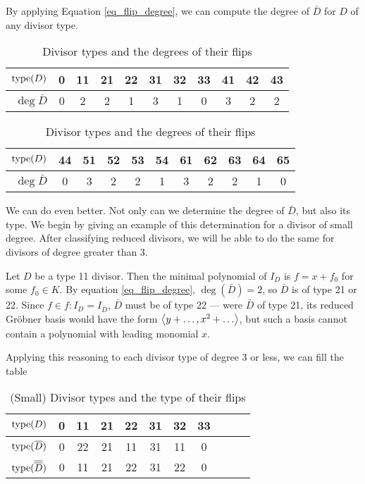 By applying Equation \ref{eq_flip_degree},
we can compute the degree of $\bar D$ for $D$ of any divisor type.
\begin{table}[hb!]
\label{tab_flip_degree}
\begin{center}
  \begin{tabular}{r|cccccccccc}
    $\operatorname{type}(D)$    & 0 & 11 & 21 & 22 & 31 & 32 & 33 & 41 & 42 & 43 \\
    \hline
    $\deg \bar D$ & 0 & 2  & 2  & 1  & 3  & 1  & 0  & 3  & 2  & 2
  \end{tabular}
    
  \begin{tabular}{r|cccccccccc}
    $\operatorname{type}(D)$    & 44 & 51 & 52 & 53 & 54 & 61 & 62 & 63 & 64 & 65 \\
    \hline 
    $\deg \bar D$ & 0  & 3  & 2  & 2  & 1  & 3  & 2  & 2  & 1  & 0
  \end{tabular}
\end{center}
\caption{Divisor types and the degrees of their flips}
\end{table}

We can do even better.
Not only can we determine the degree of $\bar D$, but also its type.
We begin by giving an example of this determination for a divisor of small degree.
After classifying reduced divisors, we will be able to do the same for divisors of degree greater than 3.

\begin{example}
  Let $D$ be a type 11 divisor.
  Then the minimal polynomial of $I_D$ is $f = x + f_0$ for some $f_0 \in K$.
  By equation \ref{eq_flip_degree}, $\deg(\bar D) = 2$, so $\bar D$ is of type 21 or 22.
  Since $f \in f : I_D = I_{\bar D}$, $\bar D$ must be of type 22 ---
  were $\bar D$ of type 21, its reduced Gr\"obner basis would have the form $\left\langle y + \ldots, x^2 + \ldots \right\rangle$,
  but such a basis cannot contain a polynomial with leading monomial $x$.
\end{example}

Applying this reasoning to each divisor type of degree 3 or less,
we can fill the table
\begin{table}[h]
\label{tab_small_flip_type}
\begin{center}
  \begin{tabular}{r|cccccccccc}
    $\operatorname{type}(D)$             & 0 & 11 & 21 & 22 & 31 & 32 & 33 \\
    \hline
    $\operatorname{type}(\overline D)$        & 0 & 22 & 21 & 11 & 31 & 11 & 0 \\
    $\operatorname{type}(\overline {\overline D})$ & 0 & 11 & 21 & 22 & 31 & 22 & 0
  \end{tabular}
\end{center}
\caption{(Small) Divisor types and the type of their flips}
\end{table}

